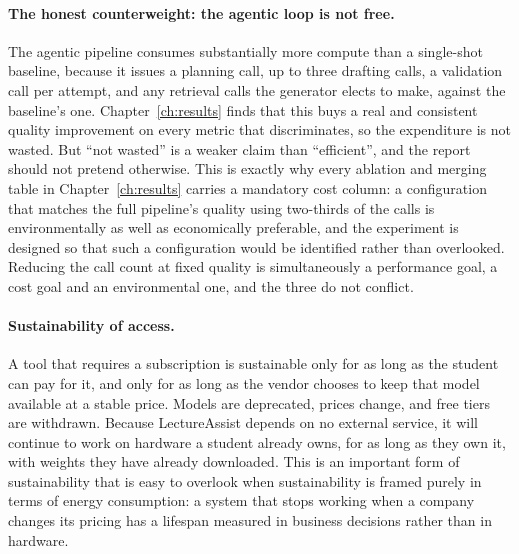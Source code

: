 \paragraph{The honest counterweight: the agentic loop is not free.} The agentic
pipeline consumes substantially more compute than a single-shot baseline, because it
issues a planning call, up to three drafting calls, a validation call per attempt,
and any retrieval calls the generator elects to make, against the baseline's one.
Chapter~\ref{ch:results} finds that this buys a real and consistent quality
improvement on every metric that discriminates, so the expenditure is not wasted.
But ``not wasted'' is a weaker claim than ``efficient'', and the report should not
pretend otherwise. This is exactly why every ablation and merging table in
Chapter~\ref{ch:results} carries a mandatory cost column: a configuration that
matches the full pipeline's quality using two-thirds of the calls is
environmentally as well as economically preferable, and the experiment is designed so
that such a configuration would be identified rather than overlooked. Reducing the
call count at fixed quality is simultaneously a performance goal, a cost goal and an
environmental one, and the three do not conflict.

\paragraph{Sustainability of access.} A tool that requires a subscription is
sustainable only for as long as the student can pay for it, and only for as long as
the vendor chooses to keep that model available at a stable price. Models are
deprecated, prices change, and free tiers are withdrawn. Because LectureAssist
depends on no external service, it will continue to work on hardware a student
already owns, for as long as they own it, with weights they have already downloaded.
This is an important form of sustainability that is easy to overlook when
sustainability is framed purely in terms of energy consumption: a system that stops
working when a company changes its pricing has a lifespan measured in business
decisions rather than in hardware.
